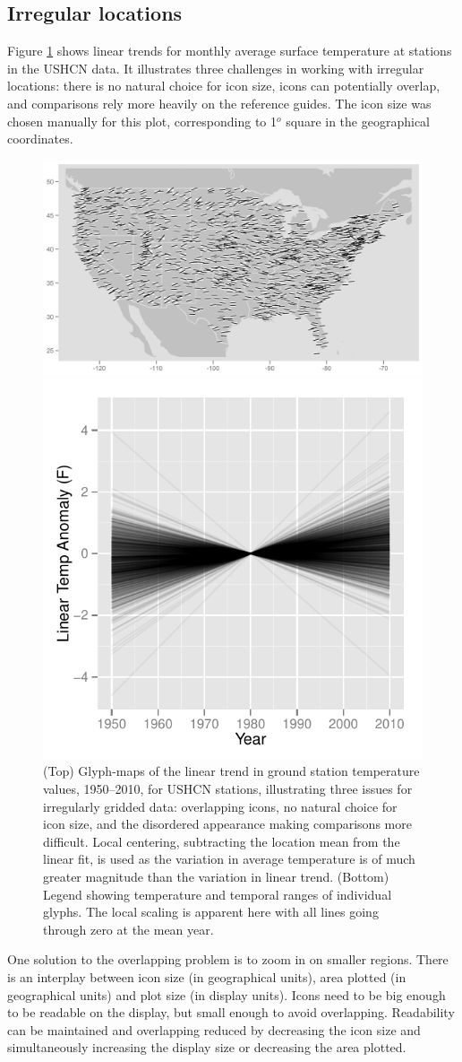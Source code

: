 \documentclass[oneside]{article}
\begin{document}
\subsection{Irregular locations}
Figure \ref{fig:irregular} shows linear trends for monthly average surface temperature at stations in the USHCN data.  It illustrates three challenges in working with irregular locations: there is no natural choice for icon size, icons can potentially overlap, and comparisons rely more heavily on the reference guides.  The icon size was chosen manually for this plot, corresponding to 1$^o$ square in the geographical coordinates. 
\begin{figure}[htbp]
  \centering
  \includegraphics[width=1\linewidth]{usa-lin-overlap}%

\includegraphics[width=0.33\linewidth]{usa-lin-legend}
  \caption{(Top) Glyph-maps of the linear trend in ground station temperature values, 1950--2010, for USHCN stations, illustrating three issues for irregularly gridded data: overlapping icons, no natural choice for icon size, and the disordered appearance making comparisons more difficult. Local centering, subtracting the location mean from the linear fit, is used as the variation in average temperature is of much greater magnitude than the variation in linear trend. (Bottom) Legend showing
    temperature and temporal ranges of individual glyphs. The local scaling is apparent here with all lines going through zero at the mean year. }  \label{fig:irregular}
\end{figure}
One solution to the overlapping problem is to zoom in on smaller regions. There is an interplay between icon size (in geographical units), area plotted (in geographical units) and plot size (in display units).  Icons need to be big enough to be readable on the display, but small enough to avoid overlapping.  Readability can be maintained and overlapping reduced by decreasing the icon size and simultaneously increasing the display size or decreasing the area plotted.
\end{document}
